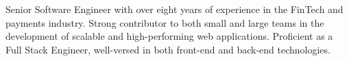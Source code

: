 

\begin{cvparagraph}

Senior Software Engineer with over eight years of experience in the FinTech and payments industry. Strong contributor to both small and large teams in the development of scalable and high-performing web applications. Proficient as a Full Stack Engineer, well-versed in both front-end and back-end technologies.

\end{cvparagraph}
